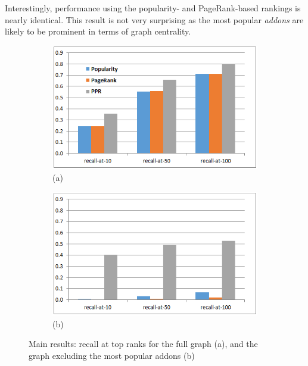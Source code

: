 \documentclass[ijoc,nonblindrev]{informs3} %
\numberwithin{equation}{subsection}
\begin{document}
Interestingly, performance using the popularity- and PageRank-based rankings is nearly identical. This result is not very surprising as the most popular {\it addons} are likely to be prominent in terms of graph centrality.

\begin{figure}[!htbp]
\centering
\begin{subfigure}[b]{0.49\textwidth}
	\centering
	\includegraphics[width=\textwidth]{figures/pop-final.png}\\
	(a)
\end{subfigure}
\begin{subfigure}[b]{0.49\textwidth}
	\centering
	\includegraphics[width=\textwidth]{figures/sans-popular-final.png}\\
	(b)
\end{subfigure}
	\caption{Main results: recall at top ranks for the full graph (a), and the graph excluding the most popular addons (b)}
	\label{fig:main}
\end{figure}
\end{document}
